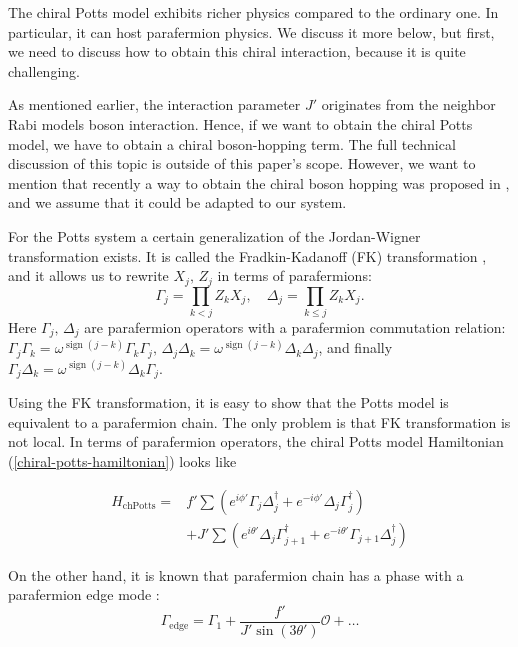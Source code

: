 \documentclass[reprint, aps, prx, amsmath, amssymb, longbibliography, superscriptaddress]{revtex4-2}
\DeclareMathOperator{\Zthree}{\mathbb{Z}_3}
\DeclareMathOperator{\sgn}{sign}
\begin{document}
The chiral Potts model exhibits richer physics compared to the ordinary one. In particular, it can host parafermion physics. We discuss it more below, but first, we need to discuss how to obtain this chiral interaction, because it is quite challenging.

As mentioned earlier, the interaction parameter $J'$ originates from the neighbor $\Zthree$ Rabi models boson interaction. Hence, if we want to obtain the chiral Potts model, we have to obtain a chiral boson-hopping term. The full technical discussion of this topic is outside of this paper's scope. However, we want to mention that recently a way to obtain the chiral boson hopping was proposed in \cite{bermudez_synthetic_2011}, and we assume that it could be adapted to our system.

For the Potts system a certain generalization of the Jordan-Wigner transformation exists. It is called the Fradkin-Kadanoff (FK) transformation \cite{fradkin_disorder_1980}, and it allows us to rewrite $X_j, \, Z_j$ in terms of parafermions:
\begin{equation}
\Gamma_j = \prod\limits_{k<j} Z_k X_j , \quad \Delta_j = \prod\limits_{k\le j} Z_k X_j.
\end{equation}
Here $\Gamma_j, \, \Delta_j$ are parafermion operators with a parafermion commutation relation: $\Gamma_j \Gamma_k = \omega^{\sgn(j-k)} \Gamma_k \Gamma_j, \, \Delta_j \Delta_k = \omega^{\sgn(j-k)} \Delta_k \Delta_j$, and finally $\Gamma_j \Delta_k = \omega^{\sgn(j-k)} \Delta_k \Gamma_j$.

Using the FK transformation, it is easy to show that the Potts model is equivalent to a parafermion chain. The only problem is that FK transformation is not local. In terms of parafermion operators, the chiral Potts model Hamiltonian (\ref{chiral-potts-hamiltonian}) looks like 


\begin{equation}
\begin{aligned}
    H_{\text{chPotts}} = &f' \sum \left( e^{i\phi'} \Gamma_j \Delta_j^{\dagger} + e^{-i\phi'} \Delta_j \Gamma_j^{\dagger}\right) \\
    &+J' \sum \left(e^{i\theta'} \Delta_j \Gamma_{j+1}^{\dagger} + e^{-i\theta'} \Gamma_{j+1} \Delta_j^{\dagger}\right)
\end{aligned}
\end{equation}



On the other hand, it is known that parafermion chain has a phase with a parafermion edge mode  \cite{fendley_parafermionic_2012}:
\begin{equation}
\Gamma_{\text{edge}} = \Gamma_1 + \frac{f'}{J' \sin(3\theta')} \mathcal{O} + \dots
\end{equation}
\end{document}
